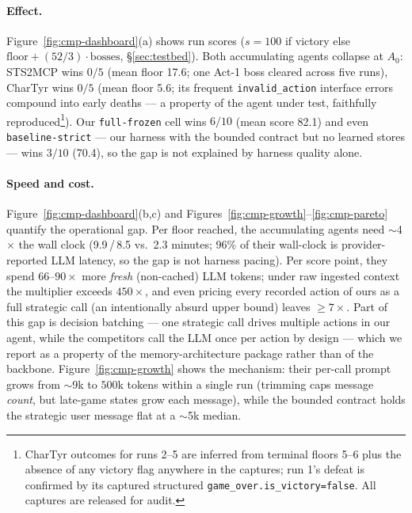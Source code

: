 \paragraph{Effect.}
Figure~\ref{fig:cmp-dashboard}(a) shows run scores ($s = 100$ if victory else
$\mathrm{floor} + (52/3)\cdot\mathrm{bosses}$, \S\ref{sec:testbed}). Both accumulating
agents collapse at $A_0$: STS2MCP wins $0/5$ (mean floor 17.6; one Act-1 boss cleared
across five runs), CharTyr wins $0/5$ (mean floor 5.6; its frequent
\texttt{invalid\_action} interface errors compound into early deaths --- a property of the
agent under test, faithfully reproduced\footnote{CharTyr outcomes for runs 2--5 are
inferred from terminal floors 5--6 plus the absence of any victory flag anywhere in the
captures; run 1's defeat is confirmed by its captured structured
\texttt{game\_over.is\_victory=false}. All captures are released for audit.}). Our
\texttt{full-frozen} cell wins $6/10$ (mean score 82.1) and even \texttt{baseline-strict}
--- our harness with the bounded contract but no learned stores --- wins $3/10$ (70.4),
so the gap is not explained by harness quality alone.

\paragraph{Speed and cost.}
Figure~\ref{fig:cmp-dashboard}(b,c) and Figures~\ref{fig:cmp-growth}--\ref{fig:cmp-pareto}
quantify the operational gap.
Per floor reached, the accumulating agents need $\sim$4$\times$ the wall clock
(9.9\,/\,8.5 vs.\ 2.3 minutes; 96\% of their wall-clock is provider-reported LLM latency,
so the gap is not harness pacing). Per score point, they spend $66$--$90\times$ more
\emph{fresh} (non-cached) LLM tokens; under raw ingested context the multiplier exceeds
$450\times$, and even pricing every recorded action of ours as a full strategic call
(an intentionally absurd upper bound) leaves $\geq 7\times$. Part of this gap is decision
batching --- one strategic call drives multiple actions in our agent, while the
competitors call the LLM once per action by design --- which we report as a property of
the memory-architecture package rather than of the backbone.
Figure~\ref{fig:cmp-growth} shows the mechanism: their per-call prompt grows from
$\sim$9k to $500$k tokens within a single run (trimming caps message \emph{count}, but
late-game states grow each message), while the bounded contract holds the strategic user
message flat at a $\sim$5k median.

